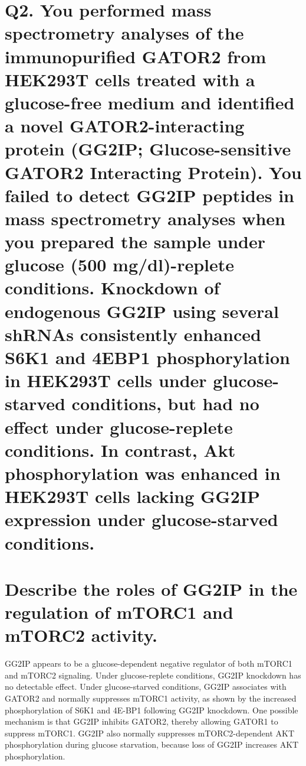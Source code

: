 \documentclass{article}
\begin{document}
\section*{
    Q2.
    You performed mass spectrometry analyses of the immunopurified GATOR2 from HEK293T cells treated with a glucose-free medium and identified a novel GATOR2-interacting protein (GG2IP; Glucose-sensitive GATOR2 Interacting Protein).
    You failed to detect GG2IP peptides in mass spectrometry analyses when you prepared the sample under glucose (500 mg/dl)-replete conditions.
    Knockdown of endogenous GG2IP using several shRNAs consistently enhanced S6K1 and 4EBP1 phosphorylation in HEK293T cells under glucose-starved conditions, but had no effect under glucose-replete conditions.
    In contrast, Akt phosphorylation was enhanced in HEK293T cells lacking GG2IP expression under glucose-starved conditions. \\
    \\
    Describe the roles of GG2IP in the regulation of mTORC1 and mTORC2 activity.
}

GG2IP appears to be a glucose-dependent negative regulator of both mTORC1 and mTORC2 signaling. Under glucose-replete conditions, GG2IP knockdown has no detectable effect. Under glucose-starved conditions, GG2IP associates with GATOR2 and normally suppresses mTORC1 activity, as shown by the increased phosphorylation of S6K1 and 4E-BP1 following GG2IP knockdown. One possible mechanism is that GG2IP inhibits GATOR2, thereby allowing GATOR1 to suppress mTORC1. GG2IP also normally suppresses mTORC2-dependent AKT phosphorylation during glucose starvation, because loss of GG2IP increases AKT phosphorylation.
\end{document}
